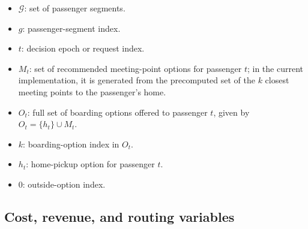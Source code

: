 \documentclass[preprint,12pt,authoryear]{elsarticle}
\begin{document}
\begin{itemize}
\item $\mathcal{G}$: set of passenger segments.
\item $g$: passenger-segment index.
\item $t$: decision epoch or request index.
\item $M_t$: set of recommended meeting-point options for passenger $t$; in the current implementation, it is generated from the precomputed set of the $k$ closest meeting points to the passenger's home.
\item $O_t$: full set of boarding options offered to passenger $t$, given by $O_t=\{h_t\}\cup M_t$.
\item $k$: boarding-option index in $O_t$.
\item $h_t$: home-pickup option for passenger $t$.
\item $0$: outside-option index.
\end{itemize}

\subsection{Cost, revenue, and routing variables}
\end{document}

